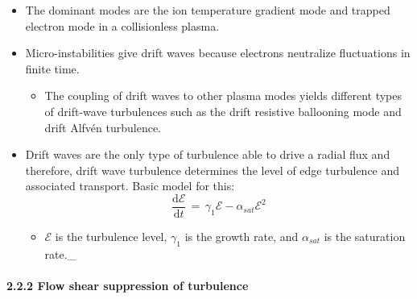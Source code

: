 \documentclass[]{article}
\providecommand{\tightlist}{%
  \setlength{\itemsep}{0pt}\setlength{\parskip}{0pt}}
\let\oldparagraph\paragraph
\renewcommand{\paragraph}[1]{\oldparagraph{#1}\mbox{}}
\begin{document}
\begin{itemize}
\item
  The dominant modes are the ion temperature gradient mode and trapped
  electron mode in a collisionless plasma.
\item
  Micro-instabilities give drift waves because electrons neutralize
  fluctuations in finite time.

  \begin{itemize}
  \tightlist
  \item
    The coupling of drift waves to other plasma modes yields different
    types of drift-wave turbulences such as the drift resistive
    ballooning mode and drift Alfvén turbulence.
  \end{itemize}
\item
  Drift waves are the only type of turbulence able to drive a radial
  flux and therefore, drift wave turbulence determines the level of edge
  turbulence and associated transport. Basic model for this:
  \[\frac{\text{d}\mathcal{E}}{\text{d}t} \,=\, \gamma_1 \mathcal{E} - \alpha_{sat}\mathcal{E}^2\]

  \begin{itemize}
  \tightlist
  \item
    \(\mathcal{E}\) is the turbulence level, \(\gamma_1\) is the growth
    rate, and \(\alpha_{sat}\) is the saturation rate.\_
  \end{itemize}
\end{itemize}

\paragraph{2.2.2 Flow shear suppression of
turbulence}\label{flow-shear-suppression-of-turbulence}
\end{document}

